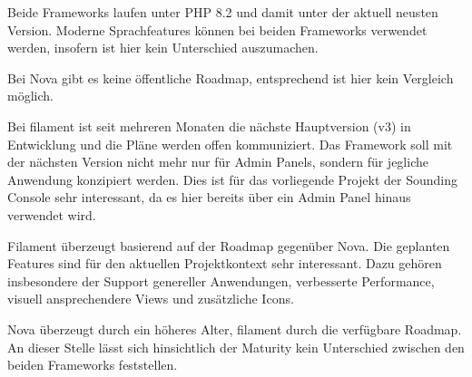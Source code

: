 Beide Frameworks laufen unter PHP 8.2 und damit unter der aktuell neusten Version.
Moderne Sprachfeatures können bei beiden Frameworks verwendet werden, insofern ist hier kein Unterschied auszumachen.

Bei Nova gibt es keine öffentliche Roadmap, entsprechend ist hier kein Vergleich möglich.

Bei filament ist seit mehreren Monaten die nächste Hauptversion (v3) in Entwicklung\cite{filament-v3-plans} und die Pläne werden offen kommuniziert.
Das Framework soll mit der nächsten Version nicht mehr nur für Admin Panels, sondern für jegliche Anwendung konzipiert werden\cite{filament-v3}.
Dies ist für das vorliegende Projekt der Sounding Console sehr interessant, da es hier bereits über ein Admin Panel hinaus verwendet wird.

Filament überzeugt basierend auf der Roadmap gegenüber Nova.
Die geplanten Features sind für den aktuellen Projektkontext sehr interessant.
Dazu gehören insbesondere der Support genereller Anwendungen, verbesserte Performance, visuell ansprechendere Views und zusätzliche Icons.

Nova überzeugt durch ein höheres Alter, filament durch die verfügbare Roadmap.
An dieser Stelle lässt sich hinsichtlich der Maturity kein Unterschied zwischen den beiden Frameworks feststellen.
